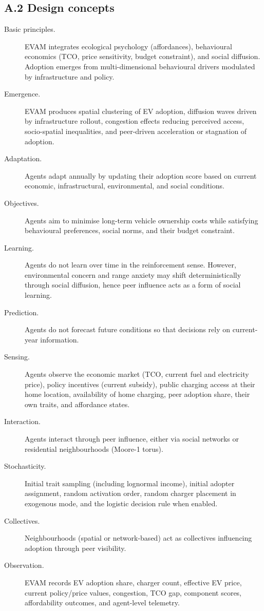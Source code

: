 \documentclass[11pt]{article}
\begin{document}
\subsection*{A.2 Design concepts}

\begin{description}
\item[Basic principles.] EVAM integrates ecological psychology
  (affordances), behavioural economics (TCO, price sensitivity, budget
  constraint), and social diffusion. Adoption emerges from
  multi-dimensional behavioural drivers modulated by infrastructure and
  policy.
\item[Emergence.] EVAM produces spatial clustering of EV adoption,
  diffusion waves driven by infrastructure rollout, congestion effects
  reducing perceived access, socio-spatial inequalities, and peer-driven
  acceleration or stagnation of adoption.
\item[Adaptation.] Agents adapt annually by updating their adoption score
  based on current economic, infrastructural, environmental, and social
  conditions.
\item[Objectives.] Agents aim to minimise long-term vehicle ownership costs
  while satisfying behavioural preferences, social norms, and their budget
  constraint.
\item[Learning.] Agents do not learn over time in the reinforcement sense.
  However, environmental concern and range anxiety may shift
  deterministically through social diffusion, hence peer influence acts as
  a form of social learning.
\item[Prediction.] Agents do not forecast future conditions so that
  decisions rely on current-year information.
\item[Sensing.] Agents observe the economic market (TCO, current fuel and
  electricity price), policy incentives (current subsidy), public charging
  access at their home location, availability of home charging, peer
  adoption share, their own traits, and affordance states.
\item[Interaction.] Agents interact through peer influence, either via
  social networks or residential neighbourhoods (Moore-1 torus).
\item[Stochasticity.] Initial trait sampling (including lognormal income),
  initial adopter assignment, random activation order, random charger
  placement in exogenous mode, and the logistic decision rule when enabled.
\item[Collectives.] Neighbourhoods (spatial or network-based) act as
  collectives influencing adoption through peer visibility.
\item[Observation.] EVAM records EV adoption share, charger count,
  effective EV price, current policy/price values, congestion, TCO gap,
  component scores, affordability outcomes, and agent-level telemetry.
\end{description}
\end{document}

